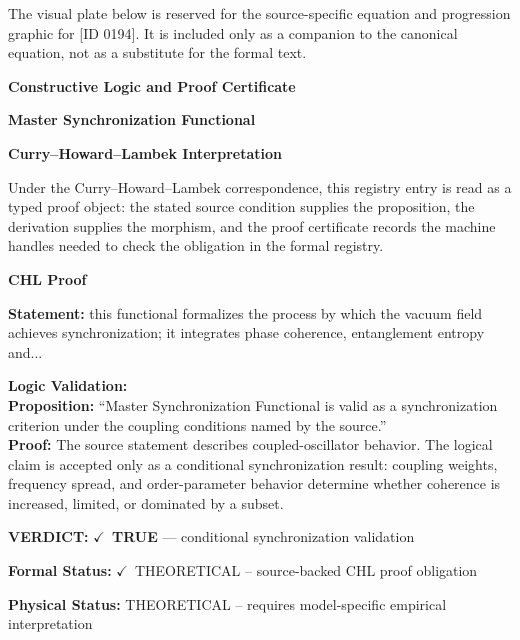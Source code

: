 \begingroup\footnotesize\sloppy
The visual plate below is reserved for the source-specific equation and progression graphic for [ID 0194]. It is included only as a companion to the canonical equation, not as a substitute for the formal text.
\par\endgroup
\ifTZPDarkEdition
{}
\fi

\clearpage
\begingroup\tzpsupportsetup
\noindent\textbf{\fontsize{10.8pt}{12.8pt}\selectfont [ID 0194] Constructive Logic and Proof Certificate}\par
\noindent\textbf{\fontsize{10pt}{12pt}\selectfont Master Synchronization Functional}\par
\vspace{0.45em}
\begingroup
\footnotesize
\setlength{\parskip}{0.22em}
\setlength{\parindent}{0pt}
\noindent\textbf{Curry--Howard--Lambek Interpretation}\par
Under the Curry--Howard--Lambek correspondence, this registry entry is read as a typed proof
object: the stated source condition supplies the proposition, the derivation supplies the
morphism, and the proof certificate records the machine handles needed to check the obligation
in the formal registry.

\vspace{0.45em}
\noindent\textbf{CHL Proof}\par
\textbf{Statement:} this functional formalizes the process by which the vacuum field achieves
synchronization; it integrates phase coherence, entanglement entropy and...

\textbf{Logic Validation:}\\
\textbf{Proposition:} ``Master Synchronization Functional is valid as a synchronization criterion under the
coupling conditions named by the source.''\\
\textbf{Proof:} The source statement describes coupled-oscillator behavior. The logical claim is
accepted only as a conditional synchronization result: coupling weights, frequency
spread, and order-parameter behavior determine whether coherence is increased, limited,
or dominated by a subset.

\textbf{VERDICT:} \ensuremath{\checkmark}\ \textbf{TRUE} --- conditional synchronization validation

\textbf{Formal Status:} \ensuremath{\checkmark}\ THEORETICAL -- source-backed CHL proof obligation

\textbf{Physical Status:} THEORETICAL -- requires model-specific empirical interpretation
\par\vspace{0.45em}
\par
\ifTZPDarkEdition
{}
\fi
\endgroup
\endgroup
